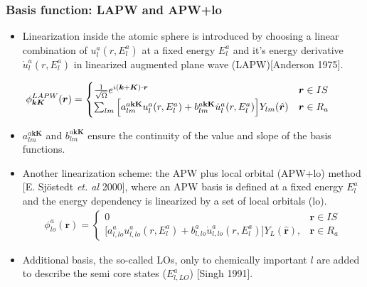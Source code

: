 \documentclass[10pt, handout]{beamer}
\newcommand{\br}{\bm{r}}
\newcommand{\bK}{\bm{K}}
\newcommand{\bk}{\bm{k}}
\begin{document}
\begin{frame}
	\frametitle{Basis function: LAPW  and APW+lo}
	\begin{itemize}
		\item Linearization inside the atomic sphere is introduced by choosing a linear combination of $u_{l}^a(r,E_l^a)$ at a fixed energy $E_l^a$ and it's energy derivative $\dot{u}^a_{l}(r,E_l^a)$ in linearized augmented plane wave (LAPW)[Anderson 1975]. 
	\end{itemize}	
\small{	
	\begin{eqnarray}\nonumber
		\phi_{\bk\bK}^{LAPW}(\br) =  \begin{cases}
			\frac{1}{\sqrt{\Omega}} e^{i(\bk+\bK)\cdot\br}         & \br \in IS  \\
			\sum_{lm} \Big[ a_{lm}^{ a \textbf{kK} } u_{l}^a(r,E_l^a) +  b_{lm}^{ a \textbf{kK} } \dot{u}_{l}^a(r,E_l^a) \Big] Y_{lm}(\hat{ \br }) &  \br \in R_a
		\end{cases}\hspace{0.5cm}
	\end{eqnarray}

    \begin{itemize}
    		\item $a_{lm}^{ a \textbf{kK}}$  and $b_{lm}^{ a \textbf{kK}}$ ensure the continuity of the value and slope  of the basis functions.
    		\item Another linearization scheme: the APW plus local orbital (APW+lo) method [E. Sj\"ostedt \textit{et. al} 2000], where an APW basis is defined at a fixed energy $E_l^a$ and the energy dependency is linearized  by a set of local orbitals (lo).    
    \begin{eqnarray}\nonumber
    	\phi_{lo}^a(\br) =
    	\begin{cases}
    		0                                                                                          & \br  \in IS    \\
    		\Big[ a_{l,lo}^a u_{l,lo}^a(r,E_l^a) + b_{l,lo}^a \dot{u}_{l,lo}^a(r,E_l^a) \Big] Y_{L}(\hat{\br}), &  \br \in R_a
    	\end{cases}
    \end{eqnarray}
          \item Additional basis, the so-called LOs, only to chemically important $l$ are added to describe the semi core states ($E_{l,LO}^a$) [Singh 1991].  
    \end{itemize}
}

\end{frame}
\end{document}
